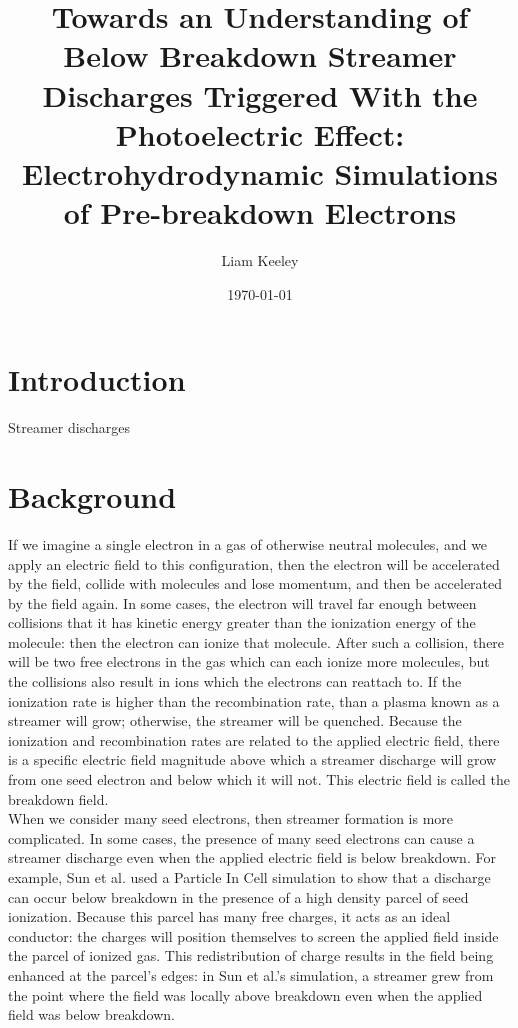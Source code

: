 \documentclass[11pt]{article}
\title{Towards an Understanding of Below Breakdown Streamer Discharges Triggered With the Photoelectric Effect: Electrohydrodynamic Simulations of Pre-breakdown Electrons}
\author{Liam Keeley}
\affil{Department of Physics, Colorado College, Colorado Springs, CO 80903}%
\date{\today}%
\begin{document}
\pagestyle{fancy}


\maketitle
\section{Introduction}
Streamer discharges

\section{Background}
If we imagine a single electron in a gas of otherwise neutral molecules, and we apply an electric field to this configuration, then the electron will be accelerated by the field, collide with molecules and lose momentum, and then be accelerated by the field again. In some cases, the electron will travel far enough between collisions that it has kinetic energy greater than the ionization energy of the molecule: then the electron can ionize that molecule. After such a collision, there will be two free electrons in the gas which can each ionize more molecules, but the collisions also result in ions which the electrons can reattach to. If the ionization rate is higher than the recombination rate, than a plasma known as a streamer will grow; otherwise, the streamer will be quenched. Because the ionization and recombination rates are related to the applied electric field, there is a specific electric field magnitude above which a streamer discharge will grow from one seed electron and below which it will not. This electric field is called the breakdown field. \\

When we consider many seed electrons, then streamer formation is more complicated. In some cases, the presence of many seed electrons can cause a streamer discharge even when the applied electric field is below breakdown. For example, Sun et al. \cite{Sun_2014} used a Particle In Cell simulation to show that a discharge can occur below breakdown in the presence of a high density parcel of seed ionization. Because this parcel has many free charges, it acts as an ideal conductor: the charges will position themselves to screen the applied field inside the parcel of ionized gas. This redistribution of charge results in the field being enhanced at the parcel's edges: in Sun et al.'s simulation, a streamer grew from the point where the field was locally above breakdown even when the applied field was below breakdown. \\
\end{document}
